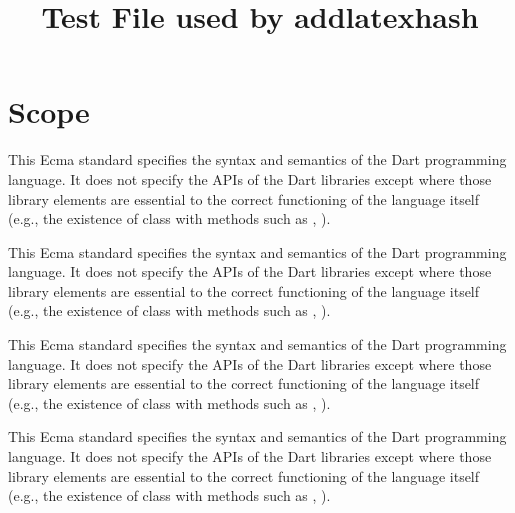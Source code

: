 \documentclass{article}
\title{Test File used by addlatexhash}
\begin{document}
\maketitle
\tableofcontents
\newpage

\pagestyle{myheadings}

\section{Scope}



\LMHash{}
This Ecma standard specifies the syntax and semantics of the Dart programming language.  It does not specify the APIs of the Dart libraries except where those library elements are essential to the correct functioning of the language itself (e.g., the existence of class  with methods such as , ).

\LMHash{}
This Ecma         standard specifies the syntax and semantics of the Dart programming language.  It does not 		specify the APIs of the Dart libraries except where those library elements are essential to the correct functioning of the language itself (e.g., the existence of class  with methods such as , ).

\LMHash{}
This Ecma standard specifies the syntax and semantics of the Dart
programming language.  It does not specify the APIs of the Dart
libraries except where those library elements are essential to the
correct functioning of the language itself (e.g., the existence of
class  with methods such as ,
).

\LMHash{}
This Ecma standard specifies the syntax and semantics of the Dart %
programming language.  It does not specify the APIs of the Dart%
libraries except where those library elements are essential to the%
correct functioning of the language itself (e.g., the existence of
class  with methods such as ,
). %
\end{document}
